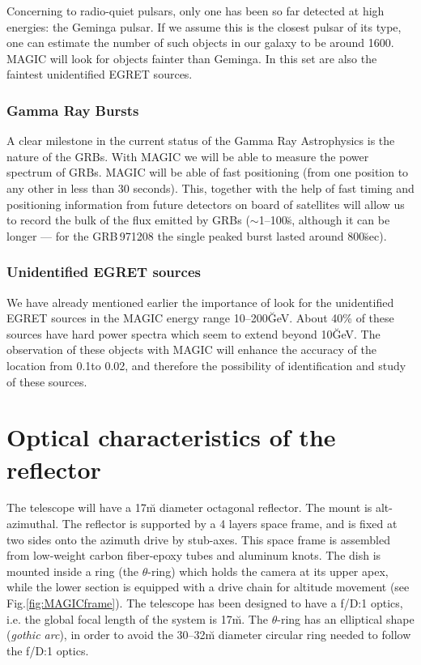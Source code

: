 Concerning to radio-quiet pulsars, only one has been so far detected
at high energies: the Geminga pulsar. If we assume this is the closest
pulsar of its type, one can estimate the number of such objects in our
galaxy to be around 1600. MAGIC will look for objects fainter than
Geminga. In this set are also the faintest unidentified EGRET sources.

\subsubsection*{Gamma Ray Bursts} 
%
A clear milestone in the current status of the Gamma Ray Astrophysics
is the nature of the GRBs. With MAGIC we will be able to measure the
power spectrum of GRBs. MAGIC will be able of fast positioning (from
one position to any other in less than 30 seconds). This, together
with the help of fast timing and positioning information from future
detectors on board of satellites will allow us to record the bulk of
the flux emitted by GRBs ($\sim$1--100\u{s}, although it can be
longer --- for the GRB\,971208 the single peaked burst lasted around
800\u{sec}).

\subsubsection*{Unidentified EGRET sources} 
%
We have already mentioned earlier the importance of look for the
unidentified EGRET sources in the MAGIC energy range 10--200\u{GeV}.
About 40\% of these sources have hard power spectra which seem to
extend beyond 10\u{GeV}. The observation of these objects with MAGIC
will enhance the accuracy of the location from 0.1\deg to 0.02\deg,
and therefore the possibility of identification and study of these
sources.

\MAGICframefig

\section{Optical characteristics of the reflector}
%
The \MAGIC telescope will have a 17\u{m} diameter octagonal reflector.
The mount is alt-azimuthal. The reflector is supported by a 4 layers
space frame, and is fixed at two sides onto the azimuth drive by
stub-axes. This space frame is assembled from low-weight carbon
fiber-epoxy tubes and aluminum knots. The dish is mounted inside a
ring (the $\theta$-ring) which holds the camera at its upper apex,
while the lower section is equipped with a drive chain for altitude
movement (see Fig.\ref{fig:MAGICframe}). The telescope has been
designed to have a f/D:1 optics, i.e. the global focal length of the
system is 17\u{m}. The $\theta$-ring has an elliptical shape
(\emph{gothic arc}), in order to avoid the 30--32\u{m} diameter
circular ring needed to follow the f/D:1 optics.

